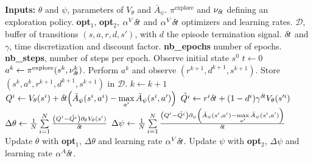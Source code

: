 \begin{algorithmic}
	\STATE \textbf{Inputs:}
	\STATE $\theta$ and $\psi$, parameters of
	$V_{\theta}$ and $\bar{A}_{\psi}$.
	\STATE $\pi^{\text{explore}}$ and $\nu_{\delta\hspace{-.1em}t}$ defining an exploration policy.
	\STATE \textbf{opt}$_1$, \textbf{opt}$_2$, $\alpha^V {\delta\hspace{-.1em}t}$ and $\alpha^V {\delta\hspace{-.1em}t}$ optimizers and learning rates.
	\STATE $\mathcal{D}$, buffer of transitions $(s, a, r, d, s')$, with $d$ the episode termination signal.
	\STATE ${\delta\hspace{-.1em}t}$ and $\gamma$, time discretization and discount factor.
	\STATE \textbf{nb\_epochs} number of epochs.
	\STATE \textbf{nb\_steps}, number of steps per epoch.
	\STATE
	\STATE Observe initial state $s^0$
	\STATE $t \gets 0$
	\STATE $a^k \leftarrow \pi^{\text{explore}}(s^k, \nu^k_{\delta\hspace{-.1em}t})$.
	\STATE Perform $a^k$ and observe $(r^{k+1}, d^{k+1}, s^{k+1})$.
	\STATE Store $(s^k, a^k, r^{k+1}, d^{k+1}, s^{k+1})$ in $\mathcal{D}$.
	\STATE $k \gets k + 1$
	\ENDFOR
	\STATE {}
	\STATE $Q^i \gets V_{\theta}(s^i) + {\delta\hspace{-.1em}t}\hspace{-.17em}\left(
	\bar{A}_{\psi}(s^i, a^i) - \max\limits_{a'}\bar{A}_{\psi}(s^i, a')\right)$
	\STATE $\tilde{Q^i} \gets r^i{\delta\hspace{-.1em}t} + (1 - d^i) \gamma^{{\delta\hspace{-.1em}t}} V_{\theta}(s'^i)$
	\STATE $\Delta \theta \gets \frac{1}{N}\sum\limits_{i=1}^N  \frac{\left(Q^i - \tilde{Q^i}\right)\partial_{\theta} V_{\theta}(s^i)}{{\delta\hspace{-.1em}t}}$
	\STATE $\Delta \psi \gets \frac{1}{N}\sum\limits_{i=1}^N \frac{\left(Q^i - \tilde{Q^i}\right)\partial_{\psi} \left(\bar{A}_{\psi}(s^i, a^i) - \max\limits_{a'}\bar{A}_{\psi}(s^i, a')\right) }{{\delta\hspace{-.1em}t}}$
	\STATE Update $\theta$ with \textbf{opt}$_1$, $\Delta \theta$ and learning rate $\alpha^V {\delta\hspace{-.1em}t}$.
	\STATE Update $\psi$ with \textbf{opt}$_2$, $\Delta \psi$ and learning rate $\alpha^A {\delta\hspace{-.1em}t}$.
	\ENDFOR
	\ENDFOR
\end{algorithmic}
